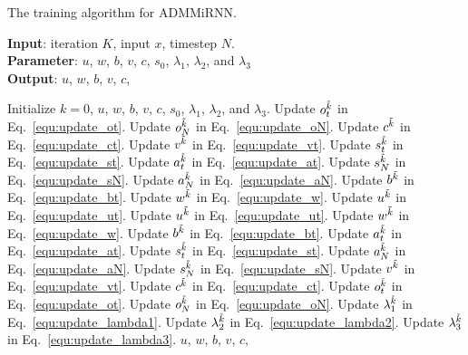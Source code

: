 \documentclass[twoside]{article}
\begin{document}
\begin{multicols}{2}
\begin{algorithm}[H]
\caption{The training algorithm for ADMMiRNN.}
\label{alg:RNN algorithm}
\textbf{Input}: iteration $K$, input $x$, timestep $N$. \\
\textbf{Parameter}: $u$, $w$, $b$, $v$, $c$, $s_0$, $\lambda_1$, $\lambda_2$, and $\lambda_3$\\
\textbf{Output}: $u$, $w$, $b$, $v$, $c$,
\begin{algorithmic}[1] %
\STATE Initialize $k=0$, $u$, $w$, $b$, $v$, $c$, $s_0$, $\lambda_1$, $\lambda_2$, and $\lambda_3$.
    \STATE Update $o_t^{\Tilde{k}}$ in Eq.~\eqref{equ:update_ot}.
    \STATE Update $o_N^{\Tilde{k}}$ in Eq.~\eqref{equ:update_oN}.
\ENDIF
    \STATE Update $c^{\Tilde{k}}$ in Eq.~\eqref{equ:update_ct}.
    \STATE Update $v^{\Tilde{k}}$ in Eq.~\eqref{equ:update_vt}.
    \STATE Update $s_t^{\Tilde{k}}$ in Eq.~\eqref{equ:update_st}.
    \STATE Update $a_t^{\Tilde{k}}$ in Eq.~\eqref{equ:update_at}.
    \STATE Update $s_N^{\Tilde{k}}$ in Eq.~\eqref{equ:update_sN}.
    \STATE Update $a_N^{\Tilde{k}}$ in Eq.~\eqref{equ:update_aN}.
\ENDIF
    \STATE Update $b^{\Tilde{k}}$ in Eq.~\eqref{equ:update_bt}.
    \STATE Update $w^{\Tilde{k}}$ in Eq.~\eqref{equ:update_w}.
    \STATE Update $u^{\Tilde{k}}$ in Eq.~\eqref{equ:update_ut}.
    \STATE Update $u^{\Tilde{k}}$ in Eq.~\eqref{equ:update_ut}.
    \STATE Update $w^{\Tilde{k}}$ in Eq.~\eqref{equ:update_w}.
    \STATE Update $b^{\Tilde{k}}$ in Eq.~\eqref{equ:update_bt}.
    \STATE Update $a_t^{\Tilde{k}}$ in Eq.~\eqref{equ:update_at}.
    \STATE Update $s_t^{\Tilde{k}}$ in Eq.~\eqref{equ:update_st}.
    \STATE Update $a_N^{\Tilde{k}}$ in Eq.~\eqref{equ:update_aN}.
    \STATE Update $s_N^{\Tilde{k}}$ in Eq.~\eqref{equ:update_sN}.
\ENDIF    
    \STATE Update $v^{\Tilde{k}}$ in Eq.~\eqref{equ:update_vt}.
    \STATE Update $c^{\Tilde{k}}$ in Eq.~\eqref{equ:update_ct}.
    \STATE Update $o_t^{\Tilde{k}}$ in Eq.~\eqref{equ:update_ot}.
    \STATE Update $o_N^{\Tilde{k}}$ in Eq.~\eqref{equ:update_oN}.
\ENDIF
\ENDFOR
\STATE Update $\lambda_1^{\Tilde{k}}$ in Eq.~\eqref{equ:update_lambda1}.
\STATE Update $\lambda_2^{\Tilde{k}}$ in Eq.~\eqref{equ:update_lambda2}.
\STATE Update $\lambda_3^{\Tilde{k}}$ in Eq.~\eqref{equ:update_lambda3}.
\ENDFOR
\STATE \RETURN $u$, $w$, $b$, $v$, $c$,
\end{algorithmic}
\end{algorithm}





\end{multicols}
\end{document}
